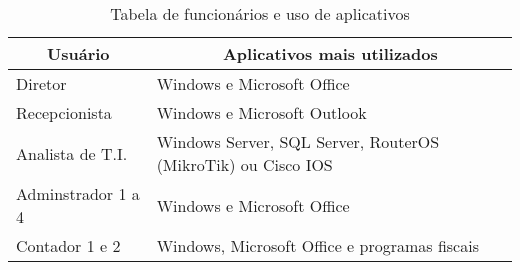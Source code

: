 \begin{table}[h!]
	\centering
	\caption{Tabela de funcionários e uso de aplicativos}
	\label{tab2}
	\renewcommand{\arraystretch}{2.0}
	\begin{tabular}{|l|l|}
		\hline
		\multicolumn{1}{|c|}{\textbf{Usuário}} &	 \multicolumn{1}{|c|}{\textbf{Aplicativos mais utilizados}}                                 		  \\ \hline		Diretor                                
		& Windows e Microsoft Office                                              \\ \hline
		Recepcionista                               
		& Windows e Microsoft Outlook            					\\ \hline
		Analista de T.I.                                  
		& Windows Server, SQL Server, RouterOS (MikroTik) ou Cisco IOS          \\ \hline
		Adminstrador 1 a 4 
		& Windows e Microsoft Office         \\ \hline
		Contador 1 e 2                                  
		& Windows, Microsoft Office e programas fiscais    \\ \hline
	\end{tabular}
\end{table}